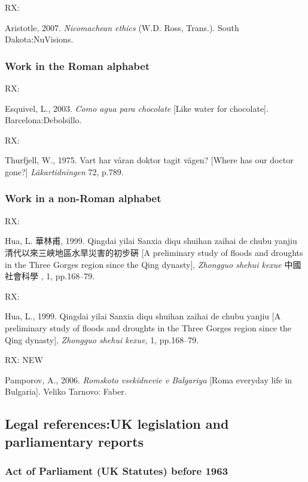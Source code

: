 RX: \cite{aristotle2007ne}

Aristotle, 2007. \emph{Nicomachean ethics} (W.D. Ross, Trans.). South Dakota:\@ NuVisions.



\subsubsection*{Work in the Roman alphabet}

RX: \cite{esquivel2003cap}

Esquivel, L., 2003. \emph{Como agua para chocolate} [Like water for chocolate]. Barcelona:\@ Debolsillo.



RX: \cite{thurfjell1975vhv}

Thurfjell, W., 1975. Vart har våran doktor tagit vägen? [Where has our doctor gone?] \emph{Läkartidningen} 72, p.789.



\subsubsection*{Work in a non-Roman alphabet}

RX: \cite{hua1999qys1}

Hua, L. 華林甫, 1999.  Qingdai yilai Sanxia diqu shuihan zaihai de chubu yanjiu 清代以來三峽地區水旱災害的初步硏 [A preliminary study of floods and droughts in the Three Gorges region since the Qing dynasty], \emph{Zhongguo shehui kexue} 中國社會科學 , 1, pp.168--79.


RX: \cite{hua1999qys2}

Hua, L., 1999. Qingdai yilai Sanxia diqu shuihan zaihai de chubu yanjiu [A preliminary study of floods and droughts in the Three Gorges region since the Qing dynasty], \emph{Zhongguo shehui kexue}, 1, pp.168--79.


RX: \cite{pamporov2006rvb} NEW

Pamporov, A., 2006. \emph{Romskoto vsekidnevie v Balgariya} [Roma everyday life in Bulgaria]. Veliko Tarnovo: Faber.



\subsection{Legal references:\@ UK legislation and parliamentary reports}


\subsubsection*{Act of Parliament (UK Statutes) before 1963}

